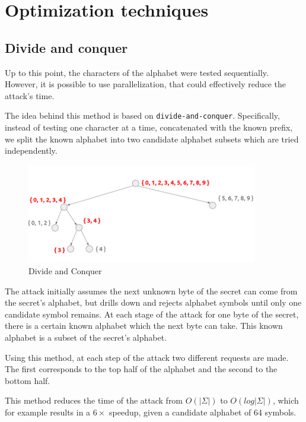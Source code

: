 \documentclass[a4paper, 11 pt, conference]{article}  %
\begin{document}

\section{Optimization techniques}

\subsection{Divide and conquer}

Up to this point, the characters of the alphabet were tested sequentially.
However, it is possible to use parallelization, that could effectively reduce the attack's time.

The idea behind this method is based on
\texttt{divide-and-conquer}. Specifically, instead of testing one
character at a time, concatenated with the known prefix, we split the
known alphabet into two candidate alphabet subsets which are tried
independently.

   \begin{figure}[thpb]
      \centering
      \includegraphics[width=0.9\textwidth]{figures/divide_and_conquer.png}
      \caption{Divide and Conquer}
   \end{figure}

The attack initially assumes the next unknown byte of the secret can come from
the secret's alphabet, but drills down and rejects alphabet symbols until
only one candidate symbol remains. At each stage of the attack for one byte of
the secret, there is a certain known alphabet which the next byte can take. This
known alphabet is a subset of the secret's alphabet.

Using this method, at each step of the attack two different requests are made.
The first corresponds to the top half of the alphabet and the second to the
bottom half.

This method reduces the time of the attack from
\begin{math}O(|\Sigma|)\end{math} to \begin{math}O(log|\Sigma|)\end{math},
which for example results in a $6\times$ speedup, given a candidate alphabet of 64 symbols.
\end{document}
